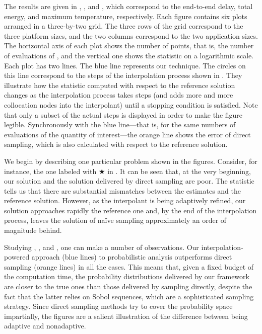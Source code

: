 The results are given in ,
, and ,
which correspond to the end-to-end delay, total energy, and maximum temperature,
respectively. Each figure contains six plots arranged in a three-by-two grid.
The three rows of the grid correspond to the three platform sizes, and the two
columns correspond to the two application sizes. The horizontal axis of each
plot shows the number of points, that is, the number of evaluations of \g, and
the vertical one shows the  statistic on a logarithmic scale. Each plot
has two lines. The blue line represents our technique. The circles on this line
correspond to the steps of the interpolation process shown in
. They illustrate how the  statistic computed
with respect to the reference solution changes as the interpolation process
takes steps (and adds more and more collocation nodes into the interpolant)
until a stopping condition is satisfied. Note that only a subset of the actual
steps is displayed in order to make the figure legible. Synchronously with the
blue line---that is, for the same numbers of evaluations of the quantity of
interest---the orange line shows the error of direct sampling, which is also
calculated with respect to the reference solution.

We begin by describing one particular problem shown in the figures. Consider,
for instance, the one labeled with $\bigstar$ in
. It can be seen that, at the very beginning,
our solution and the solution delivered by direct sampling are poor. The 
statistic tells us that there are substantial mismatches between the estimates
and the reference solution. However, as the interpolant is being adaptively
refined, our solution approaches rapidly the reference one and, by the end of
the interpolation process, leaves the solution of naïve sampling approximately
an order of magnitude behind.

Studying , ,
and , one can make a number of
observations. Our interpolation-powered approach (blue lines) to probabilistic
analysis outperforms direct sampling (orange lines) in all the cases. This means
that, given a fixed budget of the computation time, the probability
distributions delivered by our framework are closer to the true ones than those
delivered by sampling \g directly, despite the fact that the latter relies on
Sobol sequences, which are a sophisticated sampling strategy. Since direct
sampling methods try to cover the probability space impartially, the figures are
a salient illustration of the difference between being adaptive and nonadaptive.

